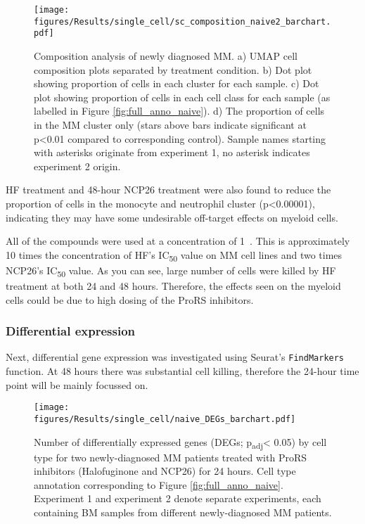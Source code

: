 \begin{figure}[htb]
\centering
\texttt{[image: figures/Results/single\_cell/sc\_composition\_naive2\_barchart.pdf]}
\caption[Composition analysis- newly diagnosed MM]{Composition analysis of newly diagnosed MM.
    a) UMAP cell composition plots separated by treatment condition.
    b) Dot plot showing proportion of cells in each cluster for each sample.
    c) Dot plot showing proportion of cells in each cell class for each sample (as labelled in Figure \ref{fig:full_anno_naive}).
    d) The proportion of cells in the MM cluster only (stars above bars indicate significant at p<0.01 compared to corresponding control).
    Sample names starting with asterisks originate from experiment 1, no asterisk indicates experiment 2 origin.}
\label{fig:composition_naive}
\end{figure}

HF treatment and 48-hour NCP26 treatment were also found to reduce the proportion of cells in the monocyte and neutrophil cluster (p<0.00001), indicating they may have some undesirable off-target effects on myeloid cells.

All of the compounds were used at a concentration of 1\si{\micro\Molar}.
This is approximately 10 times the concentration of HF's IC\textsubscript{50} value on MM cell lines and two times NCP26's IC\textsubscript{50} value.
As you can see, large number of cells were killed by HF treatment at both 24 and 48 hours.
Therefore, the effects seen on the myeloid cells could be due to high dosing of the ProRS inhibitors.

\subsubsection{Differential expression}
Next, differential gene expression was investigated using Seurat's \texttt{FindMarkers} function.
At 48 hours there was substantial cell killing, therefore the 24-hour time point will be mainly focussed on.
%
\begin{figure}[htb]
\centering
\texttt{[image: figures/Results/single\_cell/naive\_DEGs\_barchart.pdf]}
\caption[DEGs per cell type- newly-diagnosed MM]{Number of differentially expressed genes (DEGs; p\textsubscript{adj}< 0.05) by cell type for two newly-diagnosed MM patients treated with ProRS inhibitors (Halofuginone and NCP26) for 24 hours.
Cell type annotation corresponding to Figure \ref{fig:full_anno_naive}.
Experiment 1 and experiment 2 denote separate experiments, each containing BM samples from different newly-diagnosed MM patients.}
\label{fig:naive_deg_bar}
\end{figure}

